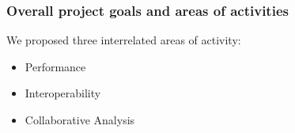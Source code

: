 \begin{frame}
\frametitle{Overall project goals and areas of activities}

We proposed three interrelated areas of activity:
\begin{itemize}
\item Performance
\item Interoperability
\item Collaborative Analysis
\end{itemize}


\end{frame}


